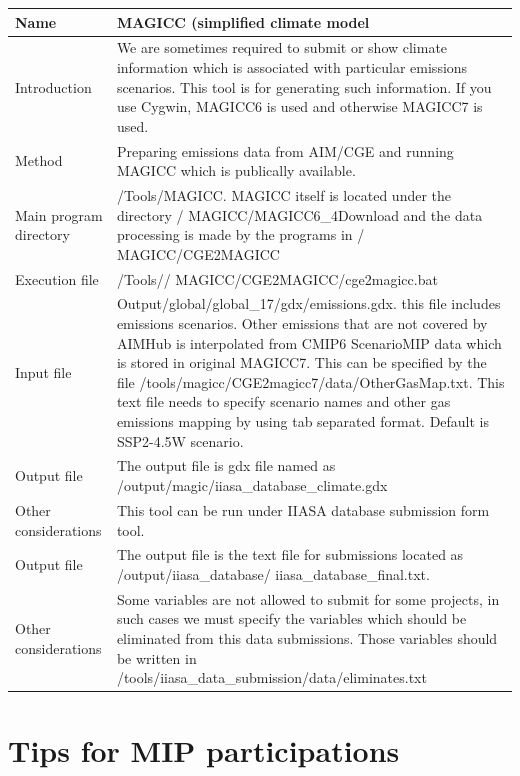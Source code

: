 \documentclass[10pt,a4paper,titlepage,dvipdfmx]{book}
\begin{document}
\begin{tabularx}{\textwidth}{|
p{}|
p{}|} \caption{\label{tab:ReaExaMAGIC}readme example for MAGICC}\\
\hline 
Name & MAGICC (simplified climate model \\\hline 
Introduction & We are sometimes required to submit or show climate information which is associated with particular emissions scenarios. This tool is for generating such information. If you use Cygwin, MAGICC6 is used and otherwise MAGICC7 is used. \\\hline 
Method & Preparing emissions data from AIM/CGE and running MAGICC which is publically available. \\\hline 
Main program directory & /Tools/MAGICC. MAGICC itself is located under the directory / MAGICC/MAGICC6\_4Download and the data processing is made by the programs in / MAGICC/CGE2MAGICC \\\hline 
Execution file & /Tools// MAGICC/CGE2MAGICC/cge2magicc.bat \\\hline 
Input file & Output/global/global\_17/gdx/emissions.gdx. this file includes emissions scenarios. Other emissions that are not covered by AIMHub is interpolated from CMIP6 ScenarioMIP data which is stored in original MAGICC7.
This can be specified by the file /tools/magicc/CGE2magicc7/data/OtherGasMap.txt. This text file needs to specify scenario names and other gas emissions mapping by using tab separated format. 
Default is SSP2-4.5W scenario.\\\hline 
Output file & The output file is gdx file named as /output/magic/iiasa\_database\_climate.gdx \\\hline 
Other considerations & This tool can be run under IIASA database submission form tool. \\\hline 
Output file & The output file is the text file for submissions located as /output/iiasa\_database/ iiasa\_database\_final.txt. \\\hline 
Other considerations & Some variables are not allowed to submit for some projects, in such cases we must specify the variables which should be eliminated from this data submissions. Those variables should be written in /tools/iiasa\_data\_submission/data/eliminates.txt \\\hline 
\end{tabularx}

\chapter{\label{chp:TipsMIP}Tips for MIP participations}
\end{document}
